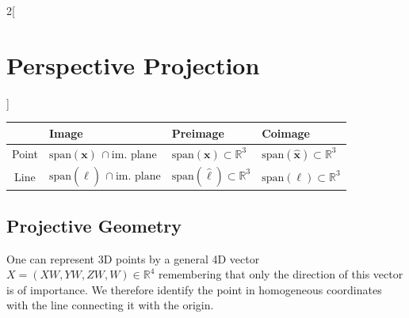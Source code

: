 \documentclass[oneside,fontsize=11pt,paper=a4]{scrartcl}
\begin{document}
\begin{multicols}{2}[\section{Perspective Projection}]
\vspace{1mm}
\renewcommand{\arraystretch}{1.3}%
\begin{tabularx}{\linewidth}{|c|Y|Y|Y|}
    \hline
     & Image & Preimage & Coimage \\ \hline
     Point & $\text{span}(\boldsymbol{x}) \, \cap \text{im. plane}$ & $\text{span}(\boldsymbol{x}) \subset \mathbb{R}^3$ & $\text{span}(\hat{\boldsymbol{x}}) \subset \mathbb{R}^3$ \\ \hline
     Line & $\text{span}(\hat{\boldsymbol{\ell}}) \, \cap \text{im. plane}$ & $\text{span}(\hat{\boldsymbol{\ell}}) \subset \mathbb{R}^3$ & $\text{span}(\boldsymbol{\ell}) \subset \mathbb{R}^3$ \\ \hline
\end{tabularx}
\renewcommand{\arraystretch}{1.0}%

\subsection{Projective Geometry}
One can represent 3D points by a general 4D vector $X = (XW, YW, ZW, W) \in \mathbb{R}^4$ remembering that only the direction of this vector is of importance.
We therefore identify the point in homogeneous coordinates with the line connecting it with the origin.
\end{multicols}
\newpage
\end{document}
